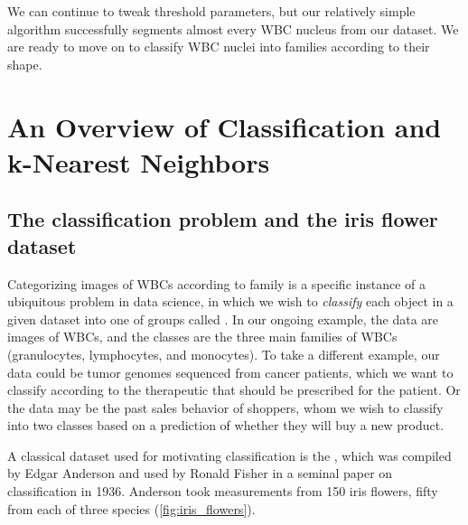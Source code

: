 We can continue to tweak threshold parameters, but our relatively simple algorithm successfully segments almost every WBC nucleus from our dataset. We are ready to move on to classify WBC nuclei into families according to their shape.\\



\FloatBarrier
{}
\section{An Overview of Classification and k-Nearest Neighbors}
\label{sec:knn}


\subsection{The classification problem and the iris flower dataset}

Categorizing images of WBCs according to family is a specific instance of a ubiquitous problem in data science, in which we wish to \textit{classify} each object in a given dataset into one of  groups called . In our ongoing example, the data are images of WBCs, and the classes are the three main families of WBCs (granulocytes, lymphocytes, and monocytes). To take a different example, our data could be tumor genomes sequenced from cancer patients, which we want to classify according to the therapeutic that should be prescribed for the patient. Or the data may be the past sales behavior of shoppers, whom we wish to classify into two classes based on a prediction of whether they will buy a new product.

A classical dataset used for motivating classification is the , which was compiled by Edgar Anderson and used by Ronald Fisher in a seminal paper on classification in 1936. Anderson took measurements from 150 iris flowers, fifty from each of three species (\autoref{fig:iris_flowers}).\\

